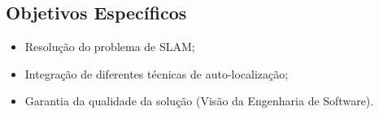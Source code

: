 
	\subsection{Objetivos Específicos} %
	\label{sub:objetivos_específicos}

	\begin{itemize}
		\item Resolução do problema de SLAM;
		\item Integração de diferentes técnicas de auto-localização;
		\item Garantia da qualidade da solução (Visão da Engenharia de Software). 
	\end{itemize}
	
